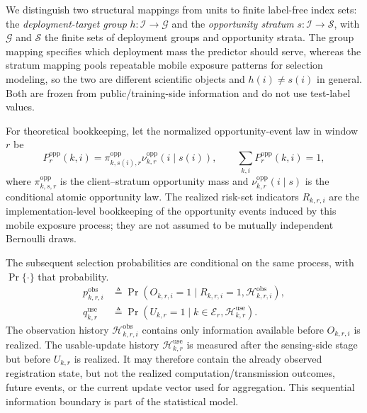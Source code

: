 \documentclass[letterpaper,journal]{IEEEtran}
\begin{document}
We distinguish two structural mappings from units to finite label-free index
sets: the \emph{deployment-target group} $h:\mathcal{I}\to\mathcal{G}$ and the
\emph{opportunity stratum} $s:\mathcal{I}\to\mathcal{S}$, with $\mathcal{G}$ and
$\mathcal{S}$ the finite sets of deployment groups and opportunity strata.  The
group mapping specifies which deployment mass the predictor should serve, whereas
the stratum mapping pools repeatable mobile exposure patterns for selection
modeling, so the two are different scientific objects and $h(i)\neq s(i)$ in
general.  Both are frozen from public/training-side information and do not use
test-label values.

For theoretical bookkeeping, let the normalized opportunity-event law in
window $r$ be
\begin{equation}
 P_r^{\mathrm{opp}}(k,i)
 =
 \pi^{\mathrm{opp}}_{k,s(i),r}
 \nu^{\mathrm{opp}}_{k,r}(i\mid s(i)),
 \qquad
 \sum_{k,i}P_r^{\mathrm{opp}}(k,i)=1,
 \label{eq:opp_event_law}
\end{equation}
where $\pi^{\mathrm{opp}}_{k,s,r}$ is the client--stratum opportunity mass and
$\nu^{\mathrm{opp}}_{k,r}(i\mid s)$ is the conditional atomic opportunity law.
The realized risk-set indicators $R_{k,r,i}$ are the implementation-level
bookkeeping of the opportunity events induced by this mobile exposure process;
they are not assumed to be mutually independent Bernoulli draws.

The subsequent selection probabilities are conditional on the same process, with
$\Pr\{\cdot\}$ that probability.
\begin{align}
 p^{\mathrm{obs}}_{k,r,i}
 &\triangleq
 \Pr\!\left(
 O_{k,r,i}=1
 \mid
 R_{k,r,i}=1,\mathcal{H}^{\mathrm{obs}}_{k,r,i}
 \right),
 \label{eq:pobs_def}\\
 q^{\mathrm{use}}_{k,r}
 &\triangleq
 \Pr\!\left(
 U_{k,r}=1
 \mid
 k\in\mathcal{E}_r,\mathcal{H}^{\mathrm{use}}_{k,r}
 \right).
 \label{eq:quse_def}
\end{align}
The observation history $\mathcal{H}^{\mathrm{obs}}_{k,r,i}$ contains
only information available before $O_{k,r,i}$ is realized.  The
usable-update history $\mathcal{H}^{\mathrm{use}}_{k,r}$ is measured
after the sensing-side stage but before $U_{k,r}$ is realized.  It may
therefore contain the already observed registration state, but not the
realized computation/transmission outcomes, future events, or the
current update vector used for aggregation.  This sequential
information boundary is part of the statistical model.
\end{document}
